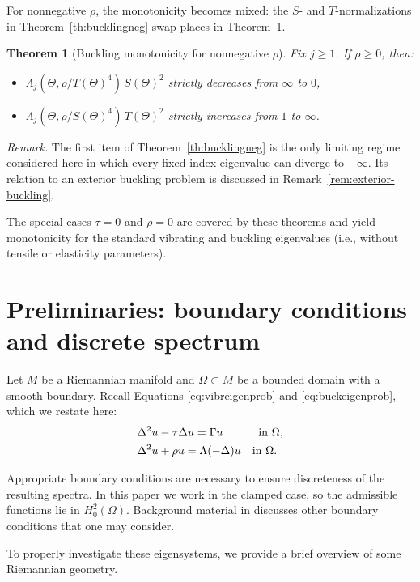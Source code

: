 \documentclass[11pt]{amsart}
\newtheorem{theorem}{Theorem}[section]
\theoremstyle{definition}
\numberwithin{equation}{section}
\newcommand{\lapl}{\Delta}
\begin{document}
For nonnegative $\rho$, the monotonicity becomes mixed: the $S$- and $T$-normalizations in
Theorem~\ref{th:bucklingneg} swap places in Theorem~\ref{th:bucklingpos}.

\begin{theorem}[Buckling monotonicity for nonnegative $\rho$]\label{th:bucklingpos}
Fix $j\ge 1$. If $\rho\ge 0$, then:
\begin{itemize}
\item $\Lambda_j(\Theta,\rho/T(\Theta)^4)\,S(\Theta)^2$ strictly decreases from $\infty$ to $0$,
\item $\Lambda_j(\Theta,\rho/S(\Theta)^4)\,T(\Theta)^2$ strictly increases from $1$ to $\infty$.
\end{itemize}
\end{theorem}

\noindent \emph{Remark.}
The first item of Theorem~\ref{th:bucklingneg} is the only limiting regime considered here in which every fixed-index eigenvalue can diverge to $-\infty$. Its relation to an exterior buckling problem is discussed in Remark~\ref{rem:exterior-buckling}.

The special cases $\tau=0$ and $\rho=0$ are covered by these theorems and yield monotonicity for the standard
vibrating and buckling eigenvalues (i.e., without tensile or elasticity parameters).

\section{Preliminaries: boundary conditions and discrete spectrum}

Let $M$ be a Riemannian manifold and $\Omega \subset M$ be a bounded domain with a smooth boundary. Recall Equations \eqref{eq:vibreigenprob} and \eqref{eq:buckeigenprob}, which we restate here:
\begin{align*}
&\lapl^2 u - \tau \lapl u = \Gamma u \hspace{1.1cm} \text{in } \Omega, \\
&\lapl^2 u + \rho u = \Lambda (-\lapl) u \quad\text{in } \Omega.
\end{align*}

Appropriate boundary conditions are necessary to ensure discreteness of the
resulting spectra. In this paper we work in the clamped case, so the admissible
functions lie in $H_0^2(\Omega)$. Background material in
\cite{C11,CP22,K93,R77} discusses other boundary conditions that one may consider. 

To properly investigate these eigensystems, we provide a brief overview of some Riemannian geometry.
\end{document}
